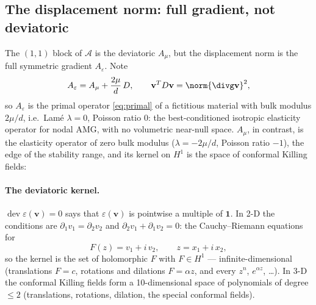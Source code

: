 \documentclass[11pt]{article}
\numberwithin{equation}{section}
\theoremstyle{remark}
\newcommand{\eps}{\varepsilon}
\newcommand{\dev}{\operatorname{dev}}
\newcommand{\vv}{\mathbf{v}}
\newcommand{\one}{\mathbf{1}}
\newcommand{\Ae}{A_{\eps}}
\newcommand{\Amu}{A_{\mu}}
\begin{document}
\subsection{The displacement norm: full gradient, not deviatoric}
\label{sec:norm}

The $(1,1)$ block of $\mathcal A$ is the deviatoric $\Amu$, but the
displacement norm is the full symmetric gradient $\Ae$. Note
\begin{equation}
  \Ae = \Amu + \frac{2\mu}{d}\,D,
  \qquad \vv^TD\vv = \norm{\divg\vv}^2 ,
\end{equation}
so $\Ae$ is the primal operator \eqref{eq:primal} of a fictitious material
with bulk modulus $2\mu/d$, i.e.\ Lamé $\lambda = 0$, Poisson ratio $0$:
the best-conditioned isotropic elasticity operator for nodal AMG, with no
volumetric near-null space. $\Amu$, in contrast, is the elasticity
operator of zero bulk modulus ($\lambda = -2\mu/d$, Poisson ratio $-1$),
the edge of the stability range, and its kernel on $H^1$ is the space of
conformal Killing fields:

\paragraph{The deviatoric kernel.} $\dev\eps(\vv) = 0$ says that $\eps(\vv)$
is pointwise a multiple of $\one$. In 2-D the conditions are $\partial_1v_1
= \partial_2v_2$ and $\partial_2v_1 + \partial_1v_2 = 0$: the
Cauchy--Riemann equations for
\begin{equation}
  F(z) = v_1 + i\,v_2, \qquad z = x_1 + i\,x_2 ,
\end{equation}
so the kernel is the set of holomorphic $F$ with $F\in H^1$ ---
infinite-dimensional (translations $F = c$, rotations and dilations $F =
\alpha z$, and every $z^n$, $e^{\alpha z}$, \ldots). In 3-D the conformal
Killing fields form a 10-dimensional space of polynomials of degree $\le2$
(translations, rotations, dilation, the special conformal fields).
\end{document}
